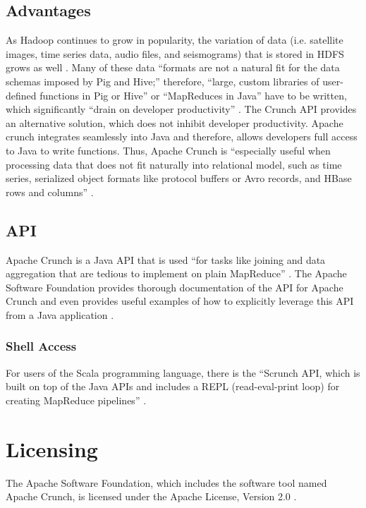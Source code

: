 \documentclass[9pt,twocolumn,twoside]{../../styles/osajnl}
\begin{document}
\subsection{Advantages}
As Hadoop continues to grow in popularity, the variation of data
(i.e. satellite images, time series data, audio files, and
seismograms) that is stored in HDFS grows as well
\cite{www-wills-crunch, www-apache-hadoop}. Many of these data
``formats are not a natural fit for the data schemas imposed by Pig
and Hive;'' therefore, ``large, custom libraries of user-defined
functions in Pig or Hive'' or ``MapReduces in Java'' have to be
written, which significantly ``drain on developer productivity''
\cite{www-wills-crunch, www-apache-pig, www-apache-hive,
  www-mapreduce}. The Crunch API provides an alternative solution,
which does not inhibit developer productivity. Apache crunch
integrates seamlessly into Java and therefore, allows developers full
access to Java to write functions. Thus, Apache Crunch is ``especially
useful when processing data that does not fit naturally into
relational model, such as time series, serialized object formats like
protocol buffers or Avro records, and HBase rows and columns''
\cite{www-crunch-api, www-apache-avro, www-apache-hbase}.

\subsection{API} \label{api}
Apache Crunch is a Java API that is used ``for tasks like joining and
data aggregation that are tedious to implement on plain MapReduce''
\cite{www-crunch-api}. The Apache Software Foundation provides
thorough documentation of the API for Apache Crunch and even provides
useful examples of how to explicitly leverage this API from a Java
application \cite{www-crunch-api}.

\subsubsection{Shell Access} \label{shell}
For users of the Scala programming language, there is the ``Scrunch
API, which is built on top of the Java APIs and includes a REPL
(read-eval-print loop) for creating MapReduce pipelines''
\cite{www-crunch-api}.

\section{Licensing} \label{licensing}
The Apache Software Foundation, which includes the software tool named
Apache Crunch, is licensed under the Apache License, Version 2.0
\cite{www-apache-lic}.
\end{document}
